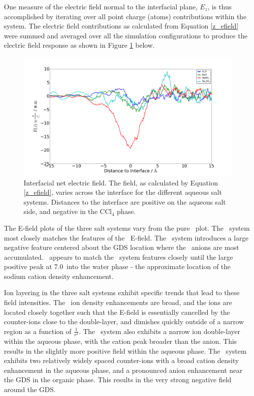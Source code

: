 \documentclass[12pt]{article}
\begin{document}
One measure of the electric field normal to the interfacial plane, $E_z$, is thus accomplished by iterating over all point charge (atoms) contributions within the system. The electric field contributions as calculated from Equation \ref{z_efield} were summed and averaged over all the simulation configurations to produce the electric field response as shown in Figure \ref{fig:e_field} below.

\begin{figure}[h!]
\begin{center}
	\includegraphics[scale=1.0]{images/electricfield.png}
	\caption{Interfacial net electric field. The field, as calculated by Equation \ref{z_efield}, varies across the interface for the different aqueous salt systems. Distances to the interface are positive on the aqueous salt side, and negative in the CCl$_4$ phase.}
	\label{fig:e_field}
\end{center}
\end{figure}

The E-field plots of the three salt systems vary from the pure \ctcwat~plot. The \nacl~system most closely matches the features of the \ctcwat~E-field. The \sodnit~system introduces a large negative feature centered about the GDS location where the \nit~anions are most accumulated. \sodsul~appears to match the \ctcwat~system features closely until the large positive peak at 7.0\angs~into the water phase - the approximate location of the sodium cation density enhancement.

Ion layering in the three salt systems exhibit specific trends that lead to these field intensities. The \nacl~ion density enhancements are broad, and the ions are located closely together such that the E-field is essentially cancelled by the counter-ions close to the double-layer, and dimishes quickly outside of a narrow region as a function of $\frac{1}{r^2}$. The \sodsul~system also exhibits a narrow ion double-layer within the aqueous phase, with the cation peak broader than the anion. This results in the slightly more positive field within the aqueous phase. The \sodnit~system exhibits two relatively widely spaced counter-ions with a broad cation density enhancement in the aqueous phase, and a pronounced anion enhancement near the GDS in the organic phase. This results in the very strong negative field around the GDS.
\end{document}
